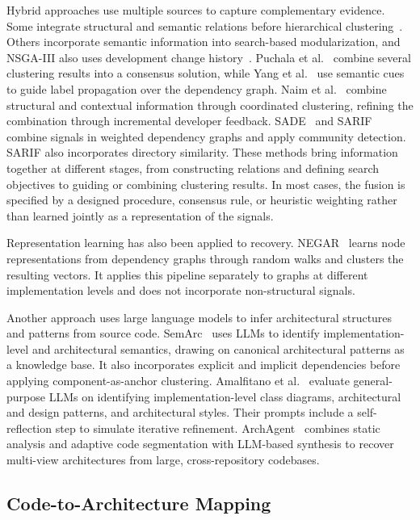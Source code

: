 Hybrid approaches use multiple sources to capture complementary evidence. Some integrate structural and semantic relations before hierarchical clustering~\cite{sc_misra,escrc}. Others incorporate semantic information into search-based modularization, and NSGA-III also uses development change history~\cite{sadat2019multi,nsga3}. Puchala et al.~\cite{ensemble_recovery} combine several clustering results into a consensus solution, while Yang et al.~\cite{evol} use semantic cues to guide label propagation over the dependency graph. Naim et al.~\cite{naim2017cchd} combine structural and contextual information through coordinated clustering, refining the combination through incremental developer feedback. SADE~\cite{sade} and SARIF~\cite{sarif} combine signals in weighted dependency graphs and apply community detection. SARIF also incorporates directory similarity. These methods bring information together at different stages, from constructing relations and defining search objectives to guiding or combining clustering results. In most cases, the fusion is specified by a designed procedure, consensus rule, or heuristic weighting rather than learned jointly as a representation of the signals.

Representation learning has also been applied to recovery. NEGAR~\cite{negar} learns node representations from dependency graphs through random walks and clusters the resulting vectors. It applies this pipeline separately to graphs at different implementation levels and does not incorporate non-structural signals.

Another approach uses large language models to infer architectural structures and patterns from source code. SemArc~\cite{sar_sem} uses LLMs to identify implementation-level and architectural semantics, drawing on canonical architectural patterns as a knowledge base. It also incorporates explicit and implicit dependencies before applying component-as-anchor clustering. Amalfitano et al.~\cite{amalfitano2025automated} evaluate general-purpose LLMs on identifying implementation-level class diagrams, architectural and design patterns, and architectural styles. Their prompts include a self-reflection step to simulate iterative refinement. ArchAgent~\cite{archagent} combines static analysis and adaptive code segmentation with LLM-based synthesis to recover multi-view architectures from large, cross-repository codebases.

\subsection{Code-to-Architecture Mapping}

